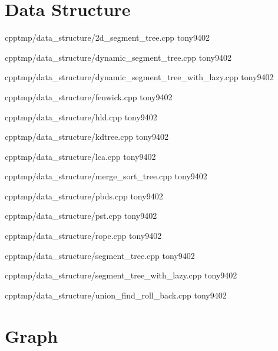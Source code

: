 \section{Data Structure}


{}
{}
{}
{cpp}{tmp/data_structure/2d_segment_tree.cpp}
{tony9402}



{}
{}
{}
{cpp}{tmp/data_structure/dynamic_segment_tree.cpp}
{tony9402}



{}
{}
{}
{cpp}{tmp/data_structure/dynamic_segment_tree_with_lazy.cpp}
{tony9402}



{}
{}
{}
{cpp}{tmp/data_structure/fenwick.cpp}
{tony9402}



{}
{}
{}
{cpp}{tmp/data_structure/hld.cpp}
{tony9402}



{}
{}
{}
{cpp}{tmp/data_structure/kdtree.cpp}
{tony9402}



{}
{}
{}
{cpp}{tmp/data_structure/lca.cpp}
{tony9402}



{}
{}
{}
{cpp}{tmp/data_structure/merge_sort_tree.cpp}
{tony9402}



{}
{}
{}
{cpp}{tmp/data_structure/pbds.cpp}
{tony9402}



{}
{}
{}
{cpp}{tmp/data_structure/pst.cpp}
{tony9402}



{}
{}
{}
{cpp}{tmp/data_structure/rope.cpp}
{tony9402}



{}
{}
{}
{cpp}{tmp/data_structure/segment_tree.cpp}
{tony9402}



{}
{}
{}
{cpp}{tmp/data_structure/segment_tree_with_lazy.cpp}
{tony9402}



{}
{}
{}
{cpp}{tmp/data_structure/union_find_roll_back.cpp}
{tony9402}


\section{Graph}


